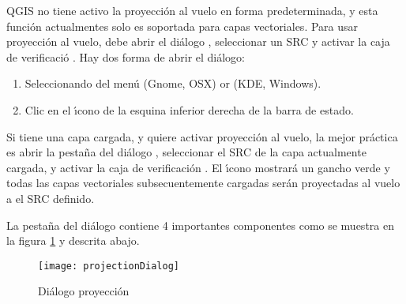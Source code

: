 QGIS no tiene activo la proyecci\'on al vuelo en forma predeterminada, y esta funci\'on actualmentes solo
es soportada para capas vectoriales. Para usar proyecci\'on al vuelo, debe
abrir el di\'alogo , seleccionar un
SRC y activar la caja de verificaci\'o .
Hay dos forma de abrir el di\'alogo:

\begin{enumerate}
\item Seleccionando  del men\'u
 (Gnome, OSX) or  (KDE, Windows).
\item Clic en el \'{\i}cono  de la
esquina inferior derecha de la barra de estado.
\end{enumerate}

Si tiene una capa cargada, y quiere activar proyecci\'on al vuelo, la
mejor pr\'actica es abrir la pesta\~na  del
di\'alogo , seleccionar el SRC de la capa actualmente cargada,
y activar la caja de verificaci\'on . El
\'{\i}cono  mostrar\'a un gancho verde
y todas las capas vectoriales subsecuentemente cargadas ser\'an proyectadas al vuelo a el
SRC definido.
 
La pesta\~na  del di\'alogo 
contiene 4 importantes componentes como se muestra en la figura
\ref{fig:projections} y descrita abajo.

\begin{figure}[ht]
   \begin{center}
   \caption{Di\'alogo proyecci\'on \nixcaption}\label{fig:projections}\smallskip
   \texttt{[image: projectionDialog]}
\end{center}  
\end{figure}

